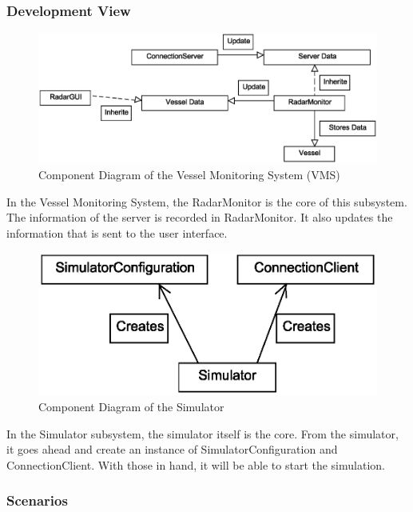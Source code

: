 \documentclass{article}
\begin{document}
\subsubsection{Development View} %
\begin{figure}[!htb]
\caption{Component Diagram of the Vessel Monitoring System (VMS)}
\centering
\includegraphics[scale=0.7]{diagrams/vms-component-diagram.eps}
\end{figure}
In the Vessel Monitoring System, the RadarMonitor is the core of this subsystem. The information of the server is recorded in RadarMonitor. It also updates the information that is sent to the user interface.

\begin{figure}[!htb]
\caption{Component Diagram of the Simulator}
\centering
\includegraphics[scale=0.7]{diagrams/simulator-component-diagram.eps}
\end{figure}
In the Simulator subsystem, the simulator itself is the core.
From the simulator, it goes ahead and create an instance of SimulatorConfiguration and ConnectionClient.
With those in hand, it will be able to start the simulation.

\break
\subsubsection{Scenarios} %
\end{document}
